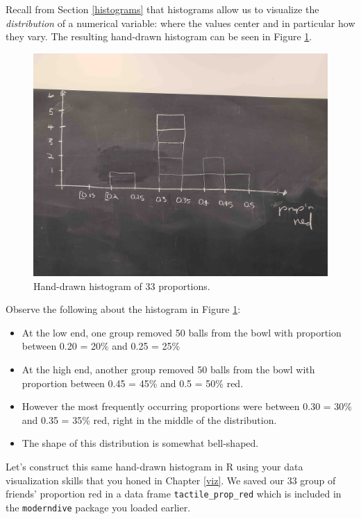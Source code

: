 \documentclass[12pt, krantz2,]{krantz}
\providecommand{\tightlist}{%
  \setlength{\itemsep}{0pt}\setlength{\parskip}{0pt}}
\begin{document}
Recall from Section \ref{histograms} that histograms allow us to visualize the \emph{distribution} of a numerical variable: where the values center and in particular how they vary. The resulting hand-drawn histogram can be seen in Figure \ref{fig:sampling-exercise-5}.

\begin{figure}

{\centering \includegraphics[width=0.8\linewidth]{images/sampling/tactile_3_c} 

}

\caption{Hand-drawn histogram of 33 proportions.}\label{fig:sampling-exercise-5}
\end{figure}

Observe the following about the histogram in Figure \ref{fig:sampling-exercise-5}:

\begin{itemize}
\tightlist
\item
  At the low end, one group removed 50 balls from the bowl with proportion between 0.20 = 20\% and 0.25 = 25\%
\item
  At the high end, another group removed 50 balls from the bowl with proportion between 0.45 = 45\% and 0.5 = 50\% red.
\item
  However the most frequently occurring proportions were between 0.30 = 30\% and 0.35 = 35\% red, right in the middle of the distribution.
\item
  The shape of this distribution is somewhat bell-shaped.
\end{itemize}

Let's construct this same hand-drawn histogram in R using your data visualization skills that you honed in Chapter \ref{viz}. We saved our 33 group of friends' proportion red in a data frame \texttt{tactile\_prop\_red} which is included in the \texttt{moderndive} package you loaded earlier.
\end{document}
